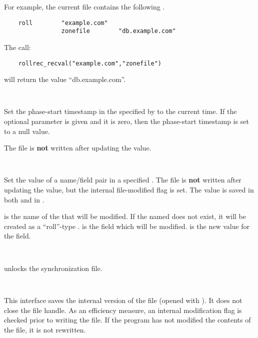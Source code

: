 \begin{description}
For example, the current  file contains the following
.

\begin{verbatim}
    roll        "example.com"
                zonefile        "db.example.com"
\end{verbatim}

The call:

\begin{verbatim}
    rollrec_recval("example.com","zonefile")
\end{verbatim}

will return the value ``db.example.com''.

\item {}\verb" "

Set the phase-start timestamp in the  specified by
 to the current time.  If the optional  parameter
is given and it is zero, then the phase-start timestamp is set to a null
value.

The file is {\bf not} written after updating the value.

\item {}\verb" "

Set the value of a name/field pair in a specified .  The file
is {\bf not} written after updating the value, but the internal file-modified
flag is set.  The value is saved in both  and in
\var{\@rollreclines}.

 is the name of the  that will be modified.
If the named  does not exist, it will be created as a
``roll''-type .   is the  field which
will be modified.   is the new value for the field.

\item {}\verb" "

 unlocks the  synchronization file.

\item {}\verb" "

This interface saves the internal version of the  file (opened
with ).  It does not close the file handle.  As an
efficiency measure, an internal modification flag is checked prior to writing
the file.  If the program has not modified the contents of the
 file, it is not rewritten.

\end{description}

